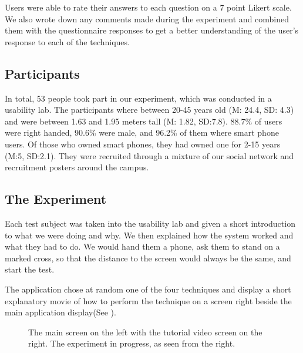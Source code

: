 Users were able to rate their answers to each question on a 7 point Likert scale. 
We also wrote down any comments made during the experiment and combined them with the questionnaire responses to get a better understanding of the user's response to each of the techniques. 

\subsection{Participants}
In total, 53 people took part in our experiment, which was conducted in a usability lab. 
The participants where between 20-45 years old (M: 24.4, SD: 4.3) and were between 1.63 and 1.95 meters tall (M: 1.82, SD:7.8). 
88.7\% of users were right handed, 90.6\% were male, and 96.2\% of them where smart phone users. 
Of those who owned smart phones, they had owned one for 2-15 years (M:5, SD:2.1). 
They were recruited through a mixture of our social network and recruitment posters around the campus. 

\subsection{The Experiment}

Each test subject was taken into the usability lab and given a short introduction to what we were doing and why. 
We then explained how the system worked and what they had to do. 
We would hand them a phone, ask them to stand on a marked cross, so that the distance to the screen would always be the same, and start the test.

The application chose at random one of the four techniques and display a short explanatory movie of how to perform the technique on a screen right beside the main application display(See ).

\begin{figure}[H]
	\centering
	\caption{
		\protect{} The main screen on the left with the tutorial video screen on the right.
		\protect{} The experiment in progress, as seen from the right. 
	}
	\label{fig:setup}
\end{figure} 

